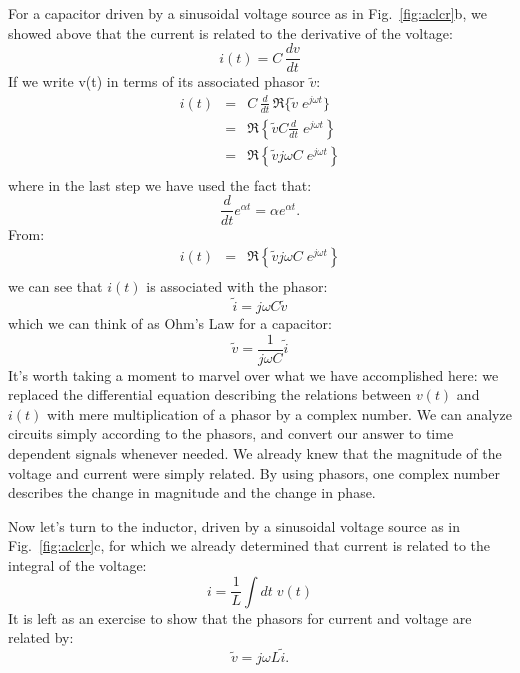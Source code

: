 \documentclass[12pt,oneside]{book}
\begin{document}
For a capacitor driven by a sinusoidal voltage source as in Fig.~\ref{fig:aclcr}b, we showed above that the current is related to the derivative of the voltage:
\begin{displaymath}
i(t) = C \, \frac{dv}{dt}
\end{displaymath}
If we write v(t) in terms of its associated phasor $\tilde{v}$:
\begin{eqnarray*}
i(t) &=& C \, \frac{d}{dt} \, \Re \{ \tilde{v} \; e^{j \omega t}\} \\
&=& \Re \left\{ \tilde{v} C \frac{d}{dt} \; e^{j \omega t} \right\} \\
&=& \Re \left\{ \tilde{v} j \omega C \; e^{j \omega t} \right\} \\
\end{eqnarray*}
where in the last step we have used the fact that:
\begin{displaymath}
\frac{d}{dt} e^{\alpha t} = \alpha e^{\alpha t}.
\end{displaymath}
From:
\begin{eqnarray*}
i(t) &=& \Re \left\{ \tilde{v} j \omega C \; e^{j \omega t} \right\} \\
\end{eqnarray*}
we can see that $i(t)$ is associated with the phasor:
\begin{displaymath}
\tilde{i} = j \omega C \tilde{v}
\end{displaymath}
which we can think of as Ohm's Law for a capacitor:
\begin{displaymath}
\tilde{v} = \frac{1}{j \omega C} \tilde{i}
\end{displaymath}
It's worth taking a moment to marvel over what we have accomplished here:  we replaced the differential equation describing the relations between $v(t)$ and $i(t)$ with mere multiplication of a phasor by a complex number.  We can analyze circuits simply according to the phasors, and convert our answer to time dependent signals whenever needed.  We already knew that the magnitude of the voltage and current were simply related.  By using phasors, one complex number describes the change in magnitude and the change in phase.

Now let's turn to the inductor, driven by a sinusoidal voltage source as in Fig.~\ref{fig:aclcr}c, for which we already determined that current is related to the integral of the voltage:
\begin{displaymath}
i = \frac{1}{L} \int dt \; v(t) 
\end{displaymath}
It is left as an exercise to show that the phasors for current and voltage are related by:
\begin{displaymath}
\tilde{v} = j \omega L \tilde{i}.
\end{displaymath}
\end{document}
